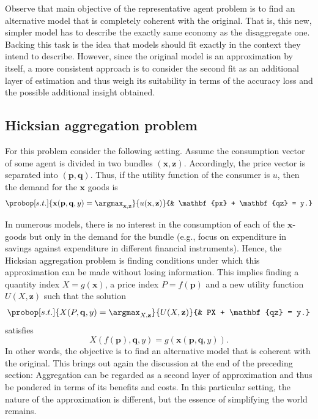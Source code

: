 \documentclass[english, a4paper, 12pt]{article}
\begin{document}
Observe that main objective of the representative agent problem is to find an alternative model that is completely coherent with the original. That is, this new, simpler model has to describe the exactly same economy as the disaggregate one. Backing this task is the idea that models should fit exactly in the context they intend to describe. However, since the original model is an approximation by itself, a more consistent approach is to consider the second fit as an additional layer of estimation and thus weigh its suitability in terms of the accuracy loss and the possible additional insight obtained.

\subsection{Hicksian aggregation problem} \label{ssec:HicksAgg}
For this problem consider the following setting. Assume the consumption vector of some agent is divided in two bundles $(\mathbf{x}, \mathbf{z})$. Accordingly, the price vector is separated into $(\mathbf{p}, \mathbf{q})$. Thus, if the utility function of the consumer is $u$, then the demand for the $\mathbf{x}$ goods is
	\begin{equation} \label{eq:hickdisprob}
		\probop[s.t.]{\mathbf{x}(\mathbf{p}, \mathbf{q}, y) = \argmax_{\mathbf{x}, \mathbf{z}}}{u(\mathbf{x}, \mathbf{z})}
					{&	\mathbf{px} + \mathbf{qz} = y.}
	\end{equation}

In numerous models, there is no interest in the consumption of each of the $\mathbf{x}$-goods but only in the demand for the bundle (e.g., focus on expenditure in savings against expenditure in different financial instruments). Hence, the Hicksian aggregation problem is finding conditions under which this approximation can be made without losing information. This implies finding a quantity index $X = g(\mathbf{x})$, a price index $P = f(\mathbf{p})$ and a new utility function $U(X, \mathbf{z})$ such that the solution
	 \begin{equation} \label{eq:hickaggprob}
		\probop[s.t.]{X(P, \mathbf{q}, y) = \argmax_{X, \mathbf{z}}}{U(X, \mathbf{z})}
					{&	PX + \mathbf{qz} = y.}
	\end{equation}
satisfies
	$$X(f(\mathbf{p}), \mathbf{q}, y) = g(\mathbf{x}(\mathbf{p}, \mathbf{q}, y)).$$
In other words, the objective is to find an alternative model that is coherent with the original. This brings out again the discussion at the end of the preceding section: Aggregation can be regarded as a second layer of approximation and thus be pondered in terms of its benefits and costs. In this particular setting, the nature of the approximation is different, but the essence of simplifying the world remains.
\end{document}
